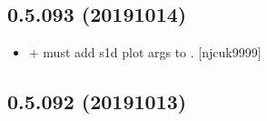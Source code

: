 \documentclass[a4paper,10pt,english]{report}
\begin{document}
\subsection{0.5.093 (2019\sphinxhyphen{}10\sphinxhyphen{}14)}
\label{\detokenize{misc/changelog:id69}}\begin{itemize}
\item {} 
 +
 \sphinxhyphen{} must add s1d plot args to
. {[}njcuk9999{]}

\end{itemize}


\subsection{0.5.092 (2019\sphinxhyphen{}10\sphinxhyphen{}13)}
\end{document}
